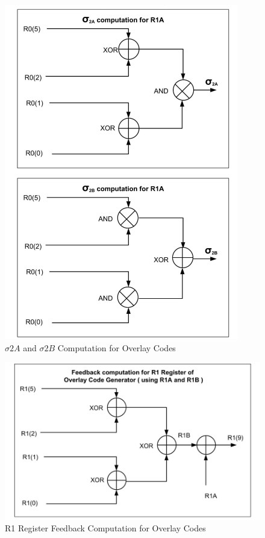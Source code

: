 \begin{figure}[h]
    \centering
    \includegraphics[width=\columnwidth]{figs/fig14.png}
    \captionsetup{justification=centering}
    \caption{$\sigma2A$ and $\sigma2B$ Computation for Overlay Codes}
    \label{fig:sigma2Boverlay}
\end{figure}

\begin{figure}[h]
    \centering
    \includegraphics[width=\columnwidth]{figs/fig15.png}
    \captionsetup{justification=centering}
    \caption{R1 Register Feedback Computation for Overlay Codes}
    \label{fig:R1overlay}
\end{figure}

